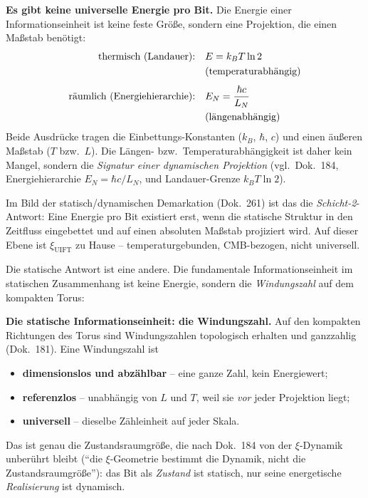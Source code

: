 	\begin{insight}
		\textbf{Es gibt keine universelle Energie pro Bit.}
		Die Energie einer Informationseinheit ist keine feste Größe, sondern eine
		Projektion, die einen Maßstab benötigt:
		\begin{align}
			\text{thermisch (Landauer):}\quad & E = k_B T \ln 2 \notag \\
			& \text{(temperaturabhängig)} \\[4pt]
			\text{räumlich (Energiehierarchie):}\quad & E_N = \frac{\hbar c}{L_N} \notag \\
			& \text{(längenabhängig)}
		\end{align}
		Beide Ausdrücke tragen die Einbettungs-Konstanten ($k_B$, $\hbar$, $c$) und einen
		äußeren Maßstab ($T$ bzw.\ $L$). Die Längen- bzw.\ Temperaturabhängigkeit ist
		daher kein Mangel, sondern die \emph{Signatur einer dynamischen Projektion}
		(vgl.\ Dok.~184, Energiehierarchie $E_N = \hbar c / L_N$, und Landauer-Grenze
		$k_B T \ln 2$).
	\end{insight}

	Im Bild der statisch/dynamischen Demarkation (Dok.~261) ist das die
	\emph{Schicht-2}-Antwort: Eine Energie pro Bit existiert erst, wenn die statische
	Struktur in den Zeitfluss eingebettet und auf einen absoluten Maßstab projiziert
	wird. Auf dieser Ebene ist $\xi_{\text{UIFT}}$ zu Hause -- temperaturgebunden,
	CMB-bezogen, nicht universell.

	Die statische Antwort ist eine andere. Die fundamentale Informationseinheit im
	statischen Zusammenhang ist keine Energie, sondern die \emph{Windungszahl} auf dem
	kompakten Torus:

	\begin{derivation}
		\textbf{Die statische Informationseinheit: die Windungszahl.}
		Auf den kompakten Richtungen des Torus sind Windungszahlen topologisch erhalten
		und ganzzahlig (Dok.~181). Eine Windungszahl ist
		\begin{itemize}
			\item \textbf{dimensionslos und abzählbar} -- eine ganze Zahl, kein Energiewert;
			\item \textbf{referenzlos} -- unabhängig von $L$ und $T$, weil sie \emph{vor}
			      jeder Projektion liegt;
			\item \textbf{universell} -- dieselbe Zähleinheit auf jeder Skala.
		\end{itemize}
		Das ist genau die Zustandsraumgröße, die nach Dok.~184 von der
		$\xi$-Dynamik unberührt bleibt (``die $\xi$-Geometrie bestimmt die Dynamik,
		nicht die Zustandsraumgröße''): das Bit als \emph{Zustand} ist statisch, nur
		seine energetische \emph{Realisierung} ist dynamisch.
	\end{derivation}

